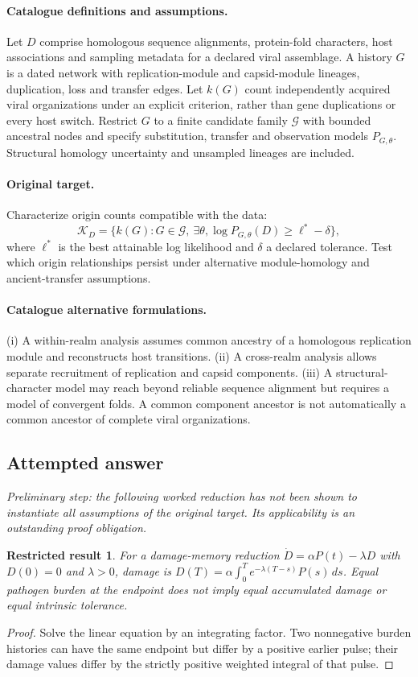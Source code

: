 \documentclass[11pt]{article}
\newtheorem{attemptresult}{Restricted result}[section]
\begin{document}
\paragraph{Catalogue definitions and assumptions.}
Let $D$ comprise homologous sequence alignments, protein-fold characters, host associations and sampling metadata for a declared viral assemblage. A history $G$ is a dated network with replication-module and capsid-module lineages, duplication, loss and transfer edges. Let $k(G)$ count independently acquired viral organizations under an explicit criterion, rather than gene duplications or every host switch. Restrict $G$ to a finite candidate family $\mathcal G$ with bounded ancestral nodes and specify substitution, transfer and observation models $P_{G,\theta}$. Structural homology uncertainty and unsampled lineages are included.
\paragraph{Original target.}
Characterize origin counts compatible with the data:
    \[\mathcal K_D=\{k(G):G\in\mathcal G,\ \exists\theta,
    \log P_{G,\theta}(D)\geq\ell^*-\delta\},\]
    where $\ell^*$ is the best attainable log likelihood and $\delta$ a declared tolerance. Test which origin relationships persist under alternative module-homology and ancient-transfer assumptions.
\paragraph{Catalogue alternative formulations.}
(i) A within-realm analysis assumes common ancestry of a homologous replication module and reconstructs host transitions. (ii) A cross-realm analysis allows separate recruitment of replication and capsid components. (iii) A structural-character model may reach beyond reliable sequence alignment but requires a model of convergent folds. A common component ancestor is not automatically a common ancestor of complete viral organizations.
\subsection{Attempted answer}
\noindent\emph{Preliminary step: the following worked reduction has not been shown to instantiate all assumptions of the original target. Its applicability is an outstanding proof obligation.}

\begin{attemptresult}
For a damage-memory reduction $\dot D=\alpha P(t)-\lambda D$ with $D(0)=0$ and $\lambda>0$, damage is $D(T)=\alpha\int_0^T e^{-\lambda(T-s)}P(s)\,ds$. Equal pathogen burden at the endpoint does not imply equal accumulated damage or equal intrinsic tolerance.
\end{attemptresult}
\begin{proof}
Solve the linear equation by an integrating factor. Two nonnegative burden histories can have the same endpoint but differ by a positive earlier pulse; their damage values differ by the strictly positive weighted integral of that pulse.
\end{proof}
\end{document}
